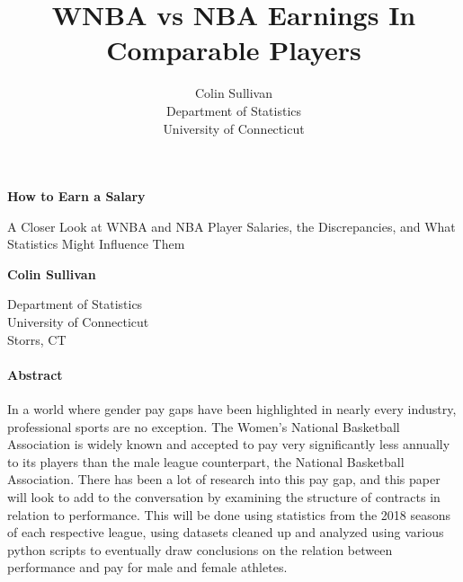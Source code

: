 \documentclass[12pt]{article}
\title{WNBA vs NBA Earnings In Comparable Players}
\author{Colin Sullivan\\
  Department of Statistics\\
  University of Connecticut
}
\begin{document}
   \begin{center}
       \vspace*{1cm}
       \Huge
       \textbf{How to Earn a Salary}

       \Large
       \vspace{0.5cm}
        A Closer Look at WNBA and NBA Player Salaries, the Discrepancies, and What Statistics Might Influence Them
            
       \vspace{1.5cm}

       \textbf{Colin Sullivan}
       
       \vfill


       \vfill
            
            
       \vspace{0.8cm}
     
         
        \Large    
       Department of Statistics\\
       University of Connecticut\\
       Storrs, CT\\
            
   \end{center}
\newpage

\paragraph{Abstract}
In a world where gender pay gaps have been highlighted in nearly every industry, professional sports are no exception. The Women’s National Basketball Association is widely known and accepted to pay very significantly less annually to its players than the male league counterpart, the National Basketball Association. There has been a lot of research into this pay gap, and this paper will look to add to the conversation by examining the structure of contracts in relation to performance. This will be done using statistics from the 2018 seasons of each respective league, using datasets cleaned up and analyzed using various python scripts to eventually draw conclusions on the relation between performance and pay for male and female athletes.
\end{document}
